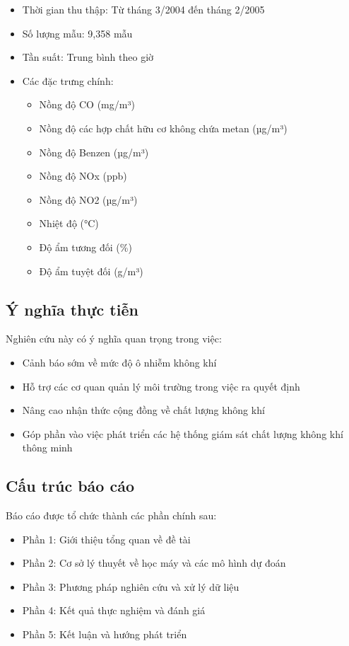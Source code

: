 \begin{itemize}
    \item Thời gian thu thập: Từ tháng 3/2004 đến tháng 2/2005
    \item Số lượng mẫu: 9,358 mẫu
    \item Tần suất: Trung bình theo giờ
    \item Các đặc trưng chính:
    \begin{itemize}
        \item Nồng độ CO (mg/m³)
        \item Nồng độ các hợp chất hữu cơ không chứa metan (µg/m³)
        \item Nồng độ Benzen (µg/m³)
        \item Nồng độ NOx (ppb)
        \item Nồng độ NO2 (µg/m³)
        \item Nhiệt độ (°C)
        \item Độ ẩm tương đối (\%)
        \item Độ ẩm tuyệt đối (g/m³)
    \end{itemize}
\end{itemize}

\subsection{Ý nghĩa thực tiễn}
\hspace{0.5cm}Nghiên cứu này có ý nghĩa quan trọng trong việc:

\begin{itemize}
    \item Cảnh báo sớm về mức độ ô nhiễm không khí
    \item Hỗ trợ các cơ quan quản lý môi trường trong việc ra quyết định
    \item Nâng cao nhận thức cộng đồng về chất lượng không khí
    \item Góp phần vào việc phát triển các hệ thống giám sát chất lượng không khí thông minh
\end{itemize}

\subsection{Cấu trúc báo cáo}
\hspace{0.5cm}Báo cáo được tổ chức thành các phần chính sau:

\begin{itemize}
    \item Phần 1: Giới thiệu tổng quan về đề tài
    \item Phần 2: Cơ sở lý thuyết về học máy và các mô hình dự đoán
    \item Phần 3: Phương pháp nghiên cứu và xử lý dữ liệu
    \item Phần 4: Kết quả thực nghiệm và đánh giá
    \item Phần 5: Kết luận và hướng phát triển
\end{itemize}
